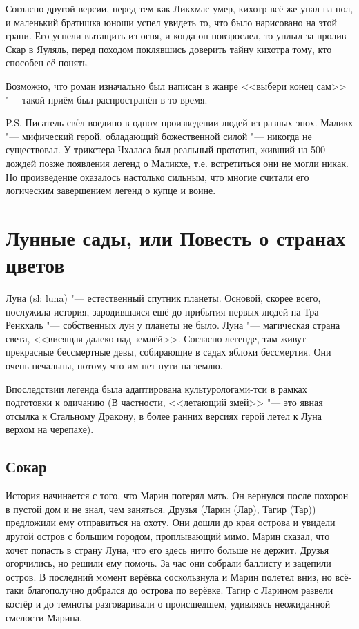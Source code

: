 Согласно другой версии, перед тем как Ликхмас умер, кихотр всё же упал на пол, и маленький братишка юноши успел увидеть то, что было нарисовано на этой грани.
Его успели вытащить из огня, и когда он повзрослел, то уплыл за пролив Скар в Яуляль, перед походом поклявшись доверить тайну кихотра тому, кто способен её понять.

Возможно, что роман изначально был написан в жанре <<выбери конец сам>> "--- такой приём был распространён в то время.

P.S. Писатель свёл воедино в одном произведении людей из разных эпох.
Маликх "--- мифический герой, обладающий божественной силой "--- никогда не существовал.
У трикстера Чхаласа был реальный прототип, живший на 500 дождей позже появления легенд о Маликхе, т.е. встретиться они не могли никак.
Но произведение оказалось настолько сильным, что многие считали его логическим завершением легенд о купце и воине.

\section{Лунные сады, или Повесть о странах цветов}

Луна (sl: luna) "--- естественный спутник планеты.
Основой, скорее всего, послужила история, зародившаяся ещё до прибытия первых людей на Тра-Ренкхаль "--- собственных лун у планеты не было.
Луна "--- магическая страна света, <<висящая далеко над землёй>>.
Согласно легенде, там живут прекрасные бессмертные девы, собирающие в садах яблоки бессмертия.
Они очень печальны, потому что им нет пути на землю.

Впоследствии легенда была адаптирована культурологами-тси в рамках подготовки к одичанию (В частности, <<летающий змей>> "--- это явная отсылка к Стальному Дракону, в более ранних версиях герой летел к Луна верхом на черепахе).

\subsection{Сокар}

История начинается с того, что Марин потерял мать.
Он вернулся после похорон в пустой дом и не знал, чем заняться.
Друзья (Ларин (Лар), Тагир (Тар)) предложили ему отправиться на охоту.
Они дошли до края острова и увидели другой остров с большим городом, проплывающий мимо.
Марин сказал, что хочет попасть в страну Луна, что его здесь ничто больше не держит.
Друзья огорчились, но решили ему помочь.
За час они собрали баллисту и зацепили остров.
В последний момент верёвка соскользнула и Марин полетел вниз, но всё-таки благополучно добрался до острова по верёвке.
Тагир с Ларином развели костёр и до темноты разговаривали о происшедшем, удивляясь неожиданной смелости Марина.

